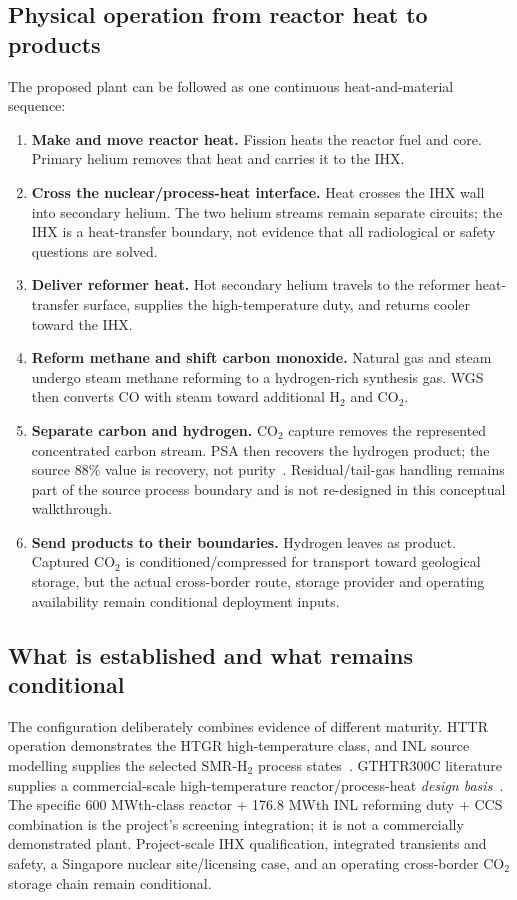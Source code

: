 \subsection{Physical operation from reactor heat to products}
The proposed plant can be followed as one continuous heat-and-material sequence:
\begin{enumerate}
\item \textbf{Make and move reactor heat.} Fission heats the reactor fuel and core. Primary helium removes that heat and carries it to the IHX.
\item \textbf{Cross the nuclear/process-heat interface.} Heat crosses the IHX wall into secondary helium. The two helium streams remain separate circuits; the IHX is a heat-transfer boundary, not evidence that all radiological or safety questions are solved.
\item \textbf{Deliver reformer heat.} Hot secondary helium travels to the reformer heat-transfer surface, supplies the high-temperature duty, and returns cooler toward the IHX.
\item \textbf{Reform methane and shift carbon monoxide.} Natural gas and steam undergo steam methane reforming to a hydrogen-rich synthesis gas. WGS then converts CO with steam toward additional H$_2$ and CO$_2$.
\item \textbf{Separate carbon and hydrogen.} CO$_2$ capture removes the represented concentrated carbon stream. PSA then recovers the hydrogen product; the source 88\% value is recovery, not purity~\cite{inltev953}. Residual/tail-gas handling remains part of the source process boundary and is not re-designed in this conceptual walkthrough.
\item \textbf{Send products to their boundaries.} Hydrogen leaves as product. Captured CO$_2$ is conditioned/compressed for transport toward geological storage, but the actual cross-border route, storage provider and operating availability remain conditional deployment inputs.
\end{enumerate}

\subsection{What is established and what remains conditional}
The configuration deliberately combines evidence of different maturity. HTTR operation demonstrates the HTGR high-temperature class, and INL source modelling supplies the selected SMR-H$_2$ process states~\cite{jaeahttr,inltev953,inltev961}. GTHTR300C literature supplies a commercial-scale high-temperature reactor/process-heat \emph{design basis}~\cite{jaeri2004gthtr300c,nishihara2007potential}. The specific 600 MWth-class reactor + 176.8 MWth INL reforming duty + CCS combination is the project's screening integration; it is not a commercially demonstrated plant. Project-scale IHX qualification, integrated transients and safety, a Singapore nuclear site/licensing case, and an operating cross-border CO$_2$ storage chain remain conditional.

